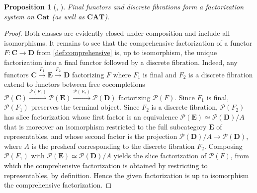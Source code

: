 \documentclass[11pt, oneside, article]{memoir}
\theoremstyle{plain}
\newtheorem{proposition}[theorem]{Proposition}
\theoremstyle{definition}
\theoremstyle{remark}
\DeclarePairedDelimiter{\gen}{\langle}{\rangle}
\DeclarePairedDelimiter{\abs}{\lvert}{\rvert}
\newcommand{\xto}[1]{\xrightarrow{#1}}
\newcommand{\namedcat}[1]{\mathbf{#1}}
\newcommand{\cat}[1]{\mathbf{#1}}
\newcommand{\Cat}{\namedcat{Cat}}
\newcommand{\CAT}{\namedcat{CAT}}
\newcommand{\CoalgOn}[2]{{#2}^{#1}}
\newcommand{\CoalgS}[1]{\CoalgOn{#1}{\bS}}
\newcommand{\KlOn}[2]{{#2}_{#1}}
\newcommand{\KlS}[1]{\KlOn{#1}{\bS}}
\newcommand{\pts}[1]{{\abs{#1}}}
\newcommand{\lift}[1]{\widecheck{#1}}
\newcommand{\rcarr}{\Delta}
\newcommand{\rcar}[1]{\rcarr^{#1}}
\newcommand{\rcarP}{\rcar{\cP}}
\newcommand{\ph}[1]{#1}
\newcommand{\Coco}[1]{\mathcal{P}(#1)}
\newcommand{\xA}{A}
\newcommand{\bB}{\cat{B}}
\newcommand{\bC}{\cat{C}}
\newcommand{\bD}{\cat{D}}
\newcommand{\bE}{\cat{E}}
\newcommand{\bS}{\cat{S}}
\newcommand{\pP}{\ph{P}}
\newcommand{\cP}{\gen{\pP}}
\newcommand{\lP}{\lift{\pP}}
\newcommand{\PS}{\CoalgS{\cP}}
\newcommand{\KlPS}{\KlS{\cP}}
\begin{document}
\begin{proposition}[{\cite{street-walters:comprehensive},
    \cite[Section 4.7]{kelly:enriched}}]
  Final functors and discrete fibrations form a factorization system
  on $\Cat$ (as well as $\CAT$).
\end{proposition}
\begin{proof}
  Both classes are evidently closed under composition and include all
  isomorphisms. It remains to see that the comprehensive factorization
  of a functor $F \colon \bC \to \bD$ from \cref{def:comprehensive}
  is, up to isomorphism, the unique factorization into a final functor
  followed by a discrete fibration. Indeed, any functors
  $\bC \xto{F_1} \bE \xto{F_2} \bD$ factorizing $F$ where $F_1$ is
  final and $F_2$ is a discrete fibration extend to functors between
  free cocompletions
  $\Coco{\bC} \xto{\Coco{F_1}} \Coco{\bE} \xto{\Coco{F_2}} \Coco{\bD}$
  factorizing $\Coco{F}$. Since $F_1$ is final, $\Coco{F_1}$ preserves
  the terminal object. Since $F_2$ is a discrete fibration,
  $\Coco{F_2}$ has slice factorization whose first factor is an
  equivalence $\Coco{\bE} \simeq \Coco{\bD}/\xA$ that is moreover an
  isomorphism restricted to the full subcategory $\bE$ of
  representables, and whose second factor is the projection
  $\Coco{\bD}/\xA \to \Coco{\bD}$, where $\xA$ is the presheaf
  corresponding to the discrete fibration $F_2$. Composing
  $\Coco{F_1}$ with $\Coco{\bE} \simeq \Coco{\bD}/\xA$ yields the
  slice factorization of $\Coco{F}$, from which the comprehensive
  factorization is obtained by restricting to representables, by
  definition. Hence the given factorization is up to isomorphism the
  comprehensive factorization.
\end{proof}



\end{document}
